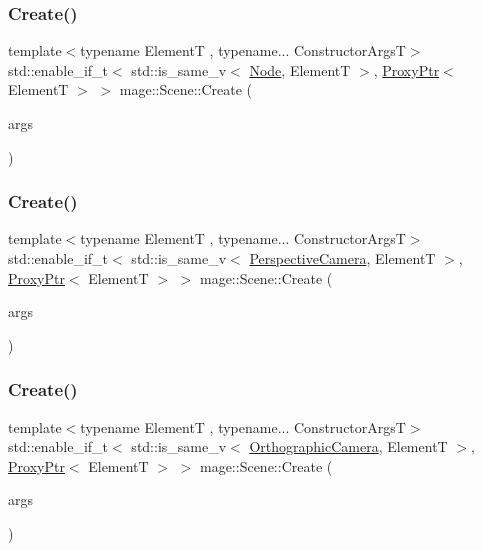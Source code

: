 \subsubsection{\texorpdfstring{Create()}{Create()}\hspace{0.1cm}{\footnotesize\ttfamily [1/11]}}
{\footnotesize\ttfamily template$<$typename ElementT , typename... Constructor\+ArgsT$>$ \\
std\+::enable\+\_\+if\+\_\+t$<$ std\+::is\+\_\+same\+\_\+v$<$ \hyperlink{classmage_1_1_node}{Node}, ElementT $>$, \hyperlink{classmage_1_1_proxy_ptr}{Proxy\+Ptr}$<$ ElementT $>$ $>$ mage\+::\+Scene\+::\+Create (\begin{DoxyParamCaption}\item[{Constructor\+ArgsT \&\&...}]{args }\end{DoxyParamCaption})}

\hypertarget{classmage_1_1_scene_a6ee9550d99197a28efbaab2c9884be10}{}\label{classmage_1_1_scene_a6ee9550d99197a28efbaab2c9884be10} 
\subsubsection{\texorpdfstring{Create()}{Create()}\hspace{0.1cm}{\footnotesize\ttfamily [2/11]}}
{\footnotesize\ttfamily template$<$typename ElementT , typename... Constructor\+ArgsT$>$ \\
std\+::enable\+\_\+if\+\_\+t$<$ std\+::is\+\_\+same\+\_\+v$<$ \hyperlink{classmage_1_1_perspective_camera}{Perspective\+Camera}, ElementT $>$, \hyperlink{classmage_1_1_proxy_ptr}{Proxy\+Ptr}$<$ ElementT $>$ $>$ mage\+::\+Scene\+::\+Create (\begin{DoxyParamCaption}\item[{Constructor\+ArgsT \&\&...}]{args }\end{DoxyParamCaption})}

\hypertarget{classmage_1_1_scene_a18f8c3f1a37c01620cecbb0e6643f2fc}{}\label{classmage_1_1_scene_a18f8c3f1a37c01620cecbb0e6643f2fc} 
\subsubsection{\texorpdfstring{Create()}{Create()}\hspace{0.1cm}{\footnotesize\ttfamily [3/11]}}
{\footnotesize\ttfamily template$<$typename ElementT , typename... Constructor\+ArgsT$>$ \\
std\+::enable\+\_\+if\+\_\+t$<$ std\+::is\+\_\+same\+\_\+v$<$ \hyperlink{classmage_1_1_orthographic_camera}{Orthographic\+Camera}, ElementT $>$, \hyperlink{classmage_1_1_proxy_ptr}{Proxy\+Ptr}$<$ ElementT $>$ $>$ mage\+::\+Scene\+::\+Create (\begin{DoxyParamCaption}\item[{Constructor\+ArgsT \&\&...}]{args }\end{DoxyParamCaption})}


